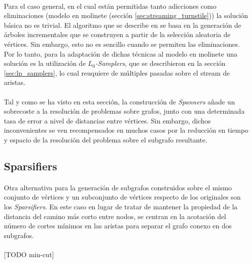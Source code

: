 \documentclass{subfiles}
\begin{document}
        \paragraph{}
        Para el caso general, en el cual están permitidas tanto adicciones como eliminaciones (modelo en molinete (sección \ref{sec:streaming_turnstile})) la solución básica no es trivial. El algoritmo que se describe en \cite{elkin2007streaming} se basa en la generación de árboles incrementales que se construyen a partir de la selección aleatoria de vértices. Sin embargo, esto no es sencillo cuando se permiten las eliminaciones. Por lo tanto, para la adaptación de dichas técnicas al modelo en molinete una solución es la utilización de \emph{$L_0$-Samplers}, que se describieron en la sección \ref{sec:lp_samplers}, lo cual reuquiere de múltiples pasadas sobre el stream de aristas.

        \paragraph{}
        Tal y como se ha visto en esta sección, la construcción de \emph{Spanners} añade un sobrecoste a la resolución de problemas sobre grafos, junto con una determinada tasa de error a nivel de distancias entre vértices. Sin embargo, dichos inconvenientes se ven recompensados en muchos casos por la reducción en tiempo y espacio de la resolución del problema sobre el subgrafo resultante.

      \subsection{Sparsifiers}
      \label{sec:sparsifiers}

        \paragraph{}
        Otra alternativa para la generación de subgrafos construidos sobre el mismo conjunto de vértices y un subconjunto de vértices respecto de los originales son los \emph{Sparsifiers}. En este caso en lugar de tratar de mantener la propiedad de la distancia del camino más corto entre nodos, se centran en la acotación del número de cortes mínimos en las aristas para separar el grafo conexo en dos subgrafos.

        \paragraph{}
        [TODO min-cut]
\end{document}
